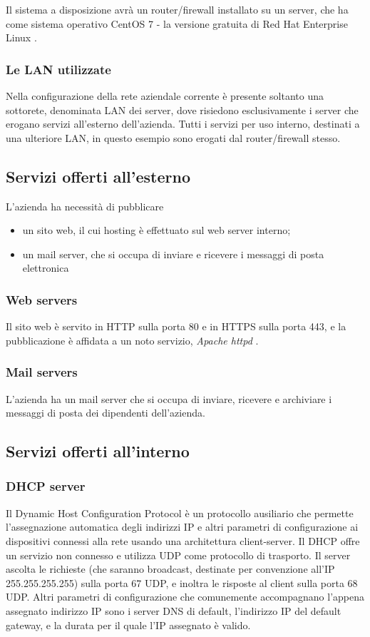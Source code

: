 Il sistema a disposizione avrà un router/firewall installato su un server, che ha come sistema operativo CentOS 7 \cite{CENTOS} - la versione gratuita di Red Hat Enterprise Linux \cite{RHEL}.

\subsubsection{Le LAN utilizzate}
Nella configurazione della rete aziendale corrente è presente soltanto una sottorete, denominata LAN dei server, dove risiedono esclusivamente i server che erogano servizi all'esterno dell'azienda. Tutti i servizi per uso interno, destinati a una ulteriore LAN, in questo esempio sono erogati dal router/firewall stesso.

\subsection{Servizi offerti all'esterno}
L'azienda ha necessità di pubblicare
\begin{itemize}
    \item un sito web, il cui hosting è effettuato sul web server interno;
    \item un mail server, che si occupa di inviare e ricevere i messaggi di posta elettronica
\end{itemize}
\subsubsection{Web servers}
Il sito web è servito in HTTP sulla porta 80 e in HTTPS sulla porta 443, e la pubblicazione è affidata a un noto servizio, \emph{Apache httpd} \cite{APACHE}.
\subsubsection{Mail servers}
L'azienda ha un mail server che si occupa di inviare, ricevere e archiviare i messaggi di posta dei dipendenti dell'azienda.

\subsection{Servizi offerti all'interno}
\subsubsection{DHCP server}
Il Dynamic Host Configuration Protocol \cite[RFC2131]{RFC2131} è un protocollo ausiliario che permette l'assegnazione automatica degli indirizzi IP e altri parametri di configurazione ai dispositivi connessi alla rete usando una architettura client-server.
Il DHCP offre un servizio non connesso e utilizza UDP come protocollo di trasporto. Il server ascolta le richieste (che saranno broadcast, destinate per convenzione all'IP 255.255.255.255) sulla porta 67 UDP, e inoltra le risposte al client sulla porta 68 UDP.
Altri parametri di configurazione che comunemente accompagnano l'appena assegnato indirizzo IP sono i server DNS \cite[RFC1034]{RFC1034} di default, l'indirizzo IP del default gateway, e la durata per il quale l'IP assegnato è valido.

